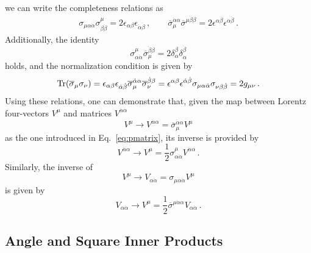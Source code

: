 we can write the completeness relations as
\begin{align}\label{eq:compl}
    \sigma_{\mu\alpha\dot\alpha}\sigma^{\mu}_{\beta\dot\beta} = 2\epsilon_{\alpha\beta}\epsilon_{\dot\alpha\dot\beta}\,, \qquad
    \overline\sigma_{\mu}^{\dot\alpha\alpha}\overline\sigma^{\mu\dot\beta\beta} = 2\epsilon^{\alpha\beta}\epsilon^{\dot\alpha\dot\beta}\,.
\end{align}
Additionally, the identity
\begin{equation}
    \sigma^\mu_{\alpha\dot\alpha}\overline\sigma_\mu^{\dot\beta \beta}=2\delta_\alpha^\beta \delta_{\dot\alpha}^{\dot\beta}
\end{equation}
holds, and the normalization condition is given by
\begin{equation}
    \Tr(\overline\sigma_\mu \sigma_\nu)=\epsilon_{\alpha\beta} \epsilon_{\dot\alpha\dot\beta}\overline\sigma_{\mu}^{\dot\alpha\alpha} \overline\sigma_\nu^{\dot\beta\beta}=\epsilon^{\alpha\beta}\epsilon^{\dot\alpha\dot\beta}\sigma_{\mu\alpha\dot\alpha}\sigma_{\nu\beta\dot\beta}=2g_{\mu\nu}\,.
\end{equation}
Using these relations, one can demonstrate that, given the map between Lorentz four-vectors $V^\mu$ and matrices $V^{\dot\alpha\alpha}$
\begin{equation}
    V^\mu \longrightarrow V^{\dot\alpha\alpha} =  \overline\sigma^{\dot\alpha\alpha}_\mu V^\mu
\end{equation}
as the one introduced in Eq.~\eqref{eq:pmatrix}, its inverse is provided by
\begin{equation}
    V^{\dot\alpha \alpha} \longrightarrow V^\mu = \frac{1}{2}\sigma^\mu_{\alpha\dot\alpha} V^{\dot\alpha \alpha}\,.
\end{equation}
Similarly, the inverse of
\begin{equation}
    V^\mu \longrightarrow V_{\alpha\dot\alpha} =  \sigma_{\mu\alpha\dot\alpha} V^\mu
\end{equation}
is given by
\begin{equation}
    V_{\alpha\dot\alpha} \longrightarrow
    V^\mu = \frac{1}{2}\overline\sigma^{\mu\dot\alpha\alpha}V_{\alpha\dot\alpha}\,.
\end{equation}

\subsection{Angle and Square Inner Products}

